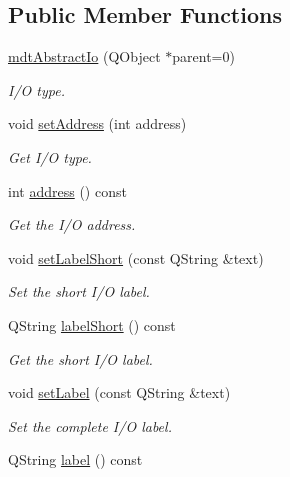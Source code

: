 \subsection*{Public Member Functions}
\begin{DoxyCompactItemize}
\item 
\hypertarget{classmdt_abstract_io_ac138b89890471e0412f2b15f2c53f1f9}{
\hyperlink{classmdt_abstract_io_ac138b89890471e0412f2b15f2c53f1f9}{mdtAbstractIo} (QObject $\ast$parent=0)}
\label{classmdt_abstract_io_ac138b89890471e0412f2b15f2c53f1f9}

\begin{DoxyCompactList}\small\item\em I/O type. \end{DoxyCompactList}\item 
void \hyperlink{classmdt_abstract_io_a1f3bfa0472c7e0bd4cd9a5b865c460a2}{setAddress} (int address)
\begin{DoxyCompactList}\small\item\em Get I/O type. \end{DoxyCompactList}\item 
\hypertarget{classmdt_abstract_io_a52f071b6c1098e74f82eade9ead5382a}{
int \hyperlink{classmdt_abstract_io_a52f071b6c1098e74f82eade9ead5382a}{address} () const }
\label{classmdt_abstract_io_a52f071b6c1098e74f82eade9ead5382a}

\begin{DoxyCompactList}\small\item\em Get the I/O address. \end{DoxyCompactList}\item 
void \hyperlink{classmdt_abstract_io_a0f0a70927942f793ce93c7f0c013a39e}{setLabelShort} (const QString \&text)
\begin{DoxyCompactList}\small\item\em Set the short I/O label. \end{DoxyCompactList}\item 
\hypertarget{classmdt_abstract_io_ad6490f8dda6df55cc3d1811348d0155e}{
QString \hyperlink{classmdt_abstract_io_ad6490f8dda6df55cc3d1811348d0155e}{labelShort} () const }
\label{classmdt_abstract_io_ad6490f8dda6df55cc3d1811348d0155e}

\begin{DoxyCompactList}\small\item\em Get the short I/O label. \end{DoxyCompactList}\item 
void \hyperlink{classmdt_abstract_io_ae614f78829c59cb7b7d8265dd59e2164}{setLabel} (const QString \&text)
\begin{DoxyCompactList}\small\item\em Set the complete I/O label. \end{DoxyCompactList}\item 
\hypertarget{classmdt_abstract_io_a8d21d147ce526f9ad9f65bde7c68b7d9}{
QString \hyperlink{classmdt_abstract_io_a8d21d147ce526f9ad9f65bde7c68b7d9}{label} () const }
\label{classmdt_abstract_io_a8d21d147ce526f9ad9f65bde7c68b7d9}


\end{DoxyCompactItemize}
